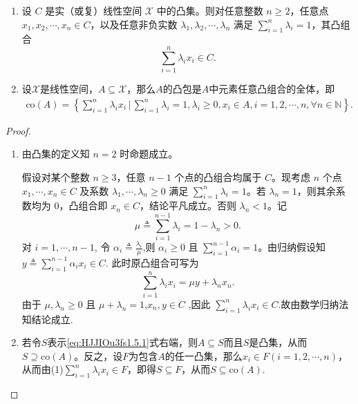 \documentclass[../../main.tex]{subfiles}%
\begin{document}
\begin{proposition}
\begin{enumerate}[(1)]
\item 设 $C$ 是实（或复）线性空间 $\mathscr{X}$ 中的凸集。则对任意整数 $n \geqslant 2$，任意点 $x_1, x_2, \cdots, x_n \in C$，以及任意非负实数 $\lambda_1, \lambda_2, \cdots, \lambda_n$ 满足 $\sum_{i=1}^n \lambda_i = 1$，其凸组合
\[
\sum_{i=1}^n \lambda_i x_i\in C.
\]

\item 设$\mathscr{X}$是线性空间，$A \subseteq \mathscr{X}$，那么$A$的凸包是$A$中元素任意凸组合的全体，即
\begin{align}
\mathrm{co}(A) = \left\{ \sum\limits_{i=1}^n \lambda_i x_i \,\bigg|\, \sum\limits_{i=1}^n \lambda_i = 1, \lambda_i \geqslant 0, x_i \in A, i = 1, 2, \cdots, n, \forall n \in \mathbb{N} \right\}. \label{eq:HJJIOu3fs1.5.1}
\end{align}
\end{enumerate}
\end{proposition}
\begin{proof}
\begin{enumerate}[(1)]
\item 由凸集的定义知 $n=2$ 时命题成立。

假设对某个整数 $n \geqslant 3$，任意 $n-1$ 个点的凸组合均属于 $C$。现考虑 $n$ 个点 $x_1, \cdots, x_n \in C$ 及系数 $\lambda_1, \cdots, \lambda_n \geqslant 0$ 满足 $\sum_{i=1}^n \lambda_i = 1$。若 $\lambda_n = 1$，则其余系数均为 $0$，凸组合即 $x_n \in C$，结论平凡成立。否则 $\lambda_n < 1$。记
$$
\mu \triangleq \sum_{i=1}^{n-1} \lambda_i = 1 - \lambda_n > 0.
$$
对 $i = 1, \cdots, n-1$, 令 $\alpha_i \triangleq \frac{\lambda_i}{\mu}$,则 $\alpha_i \geqslant 0$ 且 $\sum_{i=1}^{n-1} \alpha_i = 1$。由归纳假设知$y \triangleq \sum_{i=1}^{n-1} \alpha_i x_i\in C$.
此时原凸组合可写为
\[
\sum_{i=1}^n \lambda_i x_i = \mu y + \lambda_n x_n.
\]
由于 $\mu, \lambda_n \geqslant 0$ 且 $\mu + \lambda_n = 1$,$x_n,y \in C$ ,因此 $\sum_{i=1}^n \lambda_i x_i \in C$.故由数学归纳法知结论成立.

\item 若令$S$表示\eqref{eq:HJJIOu3fs1.5.1}式右端，则$A \subseteq S$而且$S$是凸集，从而$S \supseteq \mathrm{co}(A)$。反之，设$F$为包含$A$的任一凸集，那么$x_i \in F(i = 1, 2, \cdots, n)$，从而由(1)$\sum\limits_{i=1}^n \lambda_i x_i \in F$，即得$S \subseteq F$，从而$S \subseteq \mathrm{co}(A)$.
\end{enumerate}

\end{proof}
\end{document}
